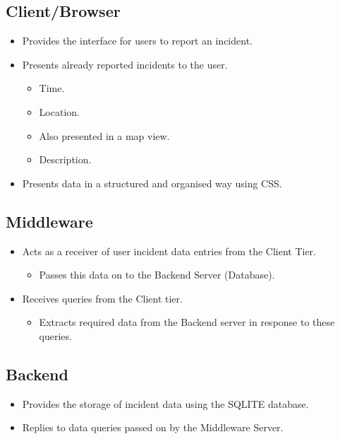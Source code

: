 \documentclass{sig-alt-release2}
\begin{document}
\subsection{Client/Browser}

\begin{itemize}
\item    Provides the interface for users to report an incident.
\item    Presents already reported incidents to the user.
\begin{itemize}
\item        Time.
\item        Location.
\item            Also presented in a map view.
\item        Description.
\end{itemize}
\item    Presents data in a structured and organised way using CSS.
\end{itemize}

\subsection{Middleware}

\begin{itemize}
\item    Acts as a receiver of user incident data entries from the Client Tier.
\begin{itemize}
\item        Passes this data on to the Backend Server (Database).
\end{itemize}
\item    Receives queries from the Client tier.
\begin{itemize}
\item        Extracts required data from the Backend server in response to these queries.
\end{itemize}
\end{itemize}

\subsection{Backend}


\begin{itemize}
\item    Provides the storage of incident data using the SQLITE database.
\item    Replies to data queries passed on by the Middleware Server.
\end{itemize}
\end{document}
